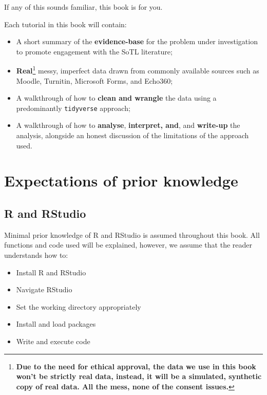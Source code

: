 \documentclass[
  oneside]{book}
\providecommand{\tightlist}{%
  \setlength{\itemsep}{0pt}\setlength{\parskip}{0pt}}
\begin{document}
If any of this sounds familiar, this book is for you.

Each tutorial in this book will contain:

\begin{itemize}
\tightlist
\item
  A short summary of the \textbf{evidence-base} for the problem under investigation to promote engagement with the SoTL literature;
\item
  \textbf{Real}\footnote{\textbf{Due to the need for ethical approval, the data we use in this book won't be strictly real data, instead, it will be a simulated, synthetic copy of real data. All the mess, none of the consent issues.}} messy, imperfect data drawn from commonly available sources such as Moodle, Turnitin, Microsoft Forms, and Echo360;
\item
  A walkthrough of how to \textbf{clean and wrangle} the data using a predominantly \texttt{tidyverse} approach;
\item
  A walkthrough of how to \textbf{analyse}, \textbf{interpret, and}, and \textbf{write-up} the analysis, alongside an honest discussion of the limitations of the approach used.
\end{itemize}

\hypertarget{expectations-of-prior-knowledge}{%
\section{Expectations of prior knowledge}\label{expectations-of-prior-knowledge}}

\hypertarget{r-and-rstudio}{%
\subsection{R and RStudio}\label{r-and-rstudio}}

Minimal prior knowledge of R and RStudio is assumed throughout this book. All functions and code used will be explained, however, we assume that the reader understands how to:

\begin{itemize}
\item
  Install R and RStudio
\item
  Navigate RStudio
\item
  Set the working directory appropriately
\item
  Install and load packages
\item
  Write and execute code
\end{itemize}
\end{document}
